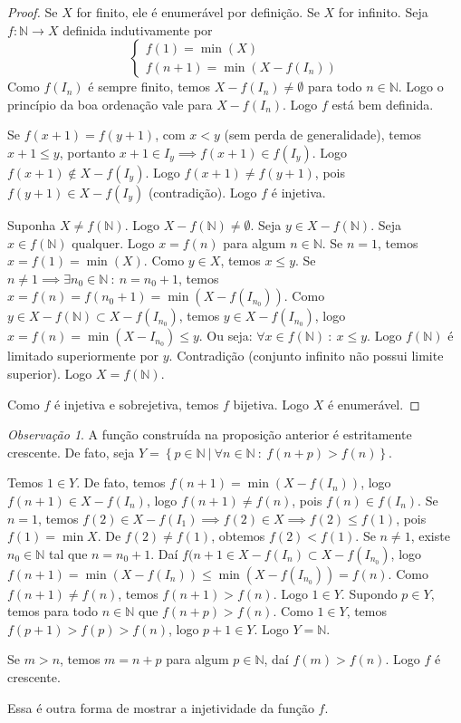 \documentclass{article}
\theoremstyle{plain}
\theoremstyle{definition}
\theoremstyle{remark}
\newtheorem{obs}{Observação}[section]
\begin{document}
\begin{proof}
	Se $X$ for finito, ele é enumerável por definição. Se $X$ for infinito. Seja $f:  \mathbb{N} \to X$ definida indutivamente por $$\begin{cases} f(1) = \min (X) \\ 
	f(n+1) = \min( X- f(I_n)) \end{cases}$$
	Como $f(I_n)$ é sempre finito, temos $X-f(I_n) \neq \emptyset$ para todo $n \in \mathbb{N}$. Logo o princípio da boa ordenação vale para $X - f(I_n)$. Logo $f$ está bem definida. 

	Se $f(x+1) = f(y+1)$, com $x<y$ (sem perda de generalidade), temos $x+1 \leq y$, portanto  $x+1 \in I_y \implies f(x+1) \in f(I_y)$. Logo $f(x+1) \not \in X - f(I_y)$. Logo $f(x+1) \neq f(y+1)$, pois $f(y+1) \in X - f(I_y)$ (contradição). Logo $f$ é injetiva.
	
	Suponha $X \neq f(\mathbb{N})$. Logo $X - f(\mathbb{N}) \neq \emptyset$. Seja $y \in X - f(\mathbb{N})$.  Seja $x\in f(\mathbb{N})$ qualquer. Logo $x = f(n)$ para algum $n \in \mathbb{N}$. Se $n = 1$, temos $x = f(1) =  \min(X)$. Como $y \in X$, temos $x \leq y$. Se $n\neq 1 \implies \exists n_0 \in \mathbb{N} \: : \: n = n_0+1$, temos $x = f(n) =  f(n_0+1) = \min (X - f(I_{n_0}))$. Como $y \in X - f(\mathbb{N}) \subset X - f(I_{n_0})$, temos $y \in X - f(I_{n_0})$, logo $x = f(n) = \min( X - I_{n_0}) \leq y$. Ou seja: $\forall x \in f\left(\mathbb{N}\right) \: : \: x\leq y$. Logo $f\left(\mathbb{N}\right)$ é limitado superiormente por $y$.  Contradição (conjunto infinito não possui limite superior). Logo $X = f(\mathbb{N})$.

	Como $f$ é injetiva e sobrejetiva, temos $f$ bijetiva. Logo $X$ é enumerável.

\end{proof}
\begin{obs}
	\label{obsCrescente}
	A função construída na proposição anterior é estritamente crescente. De fato, seja $Y = \left\{ p \in \mathbb{N} \: | \: \forall n \in \mathbb{N} \: : \:  f(n + p) > f(n)\right\}$. 

	Temos $1\in Y$. De fato, temos $f(n+1) =  \min(X - f(I_n))$, logo $f(n+1) \in X - f(I_n)$, logo $f(n+1) \neq f(n)$, pois $f(n) \in f(I_n)$. Se $n=1$, temos $f(2) \in X-f(I_1) \implies f(2) \in X \implies f(2)\leq f(1)$, pois $f(1) =  \min X$. De $f(2) \neq f(1)$, obtemos $f(2) < f(1)$. Se $n \neq 1$, existe $n_0 \in \mathbb{N}$ tal que $n = n_0 +1$. Daí $f(n +1\in X - f(I_n) \subset X - f(I_{n_0})$, logo $f(n+1) = \min(X - f(I_n)) \leq \min(X - f(I_{n_0}))  = f(n)$. Como $f(n+1) \neq f(n)$, temos $f(n+1) > f(n)$. Logo $1\in Y$.
	Supondo $p\in Y$, temos para todo $n\in \mathbb{N}$ que $f(n+p) > f(n)$. Como $1\in Y$, temos $f(p+1) > f(p) > f(n)$, logo $p+1\in Y$. Logo $Y = \mathbb{N}$.

	Se $m>n$, temos $m = n +p$ para algum $p \in \mathbb{N}$, daí $f(m) > f(n)$. Logo $f$ é crescente. 

	Essa é outra forma de mostrar a injetividade da função $f$.
\end{obs}
\end{document}
